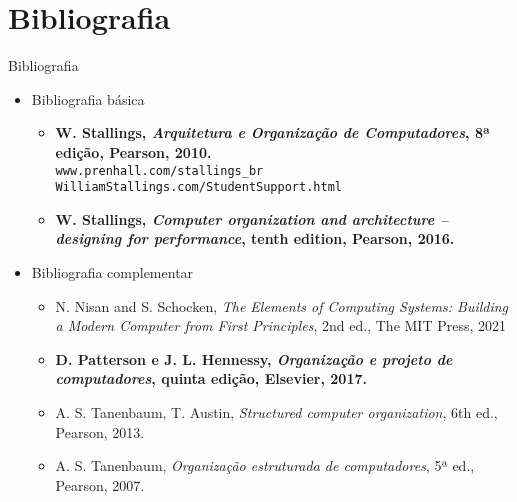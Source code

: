    \section[ slide = true]{Bibliografia}
      \begin{slide}[toc=]{Bibliografia}
         \begin{itemize}
            \item Bibliografia básica
            \begin{itemize}
               \item \textbf{W. Stallings, \emph{Arquitetura e Organização de Computadores}, 8ª edição, Pearson,  2010.}\\ \texttt{www.prenhall.com/stallings\_br}\\ \texttt{WilliamStallings.com/StudentSupport.html}
               \item \textbf{W. Stallings, \emph{Computer organization and architecture -- designing for performance}, tenth edition, Pearson,  2016.}
            \end{itemize}
            \item Bibliografia complementar
            \begin{itemize}
               \item {N. Nisan and S. Schocken, \emph{The Elements of Computing Systems: Building a Modern Computer from First Principles}, 2nd ed., The MIT Press, 2021}
	       \item \textbf{D. Patterson e J. L. Hennessy, \emph{Organização e projeto de computadores}, quinta edição, Elsevier, 2017.}
               \item {A. S. Tanenbaum, T. Austin, \emph{Structured computer organization}, 6th ed., Pearson, 2013.} 
               \item {A. S. Tanenbaum, \emph{Organização estruturada de computadores}, 5ª ed., Pearson, 2007.} 
            \end{itemize}
         \end{itemize}
      \end{slide}

